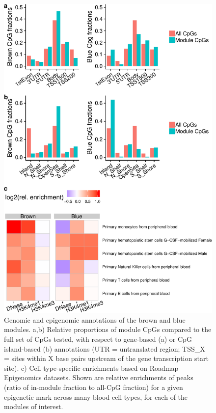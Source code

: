 \documentclass[]{bmcart}
\begin{document}
\begin{figure}[htbp]
\centering
\includegraphics{../doc/module_ewas/figures/brown-and-blue-plots-1.pdf}
\caption{\label{fig:brown-and-blue-plots}Genomic and epigenomic annotations
of the brown and blue modules. a,b) Relative proportions of module CpGs
compared to the full set of CpGs tested, with respect to gene-based (a)
or CpG island-based (b) annotations (UTR = untranslated region; TSS\_X =
sites within X base pairs upstream of the gene transcription start
site). c) Cell type-specific enrichments based on Roadmap Epigenomics
datasets. Shown are relative enrichments of peaks (ratio of in-module
fraction to all-CpG fraction) for a given epigenetic mark across many
blood cell types, for each of the modules of interest.}
\end{figure}
\end{document}
